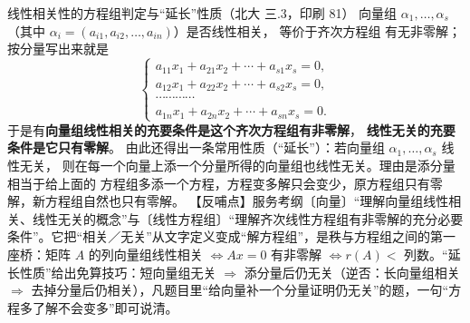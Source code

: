 
\begin{fdeep}{线性相关性的方程组判定与“延长”性质（北大 三.3，印刷 81）}
向量组 $\alpha_1,\dots,\alpha_s$（其中 $\alpha_i=(a_{i1},a_{i2},\dots,a_{in})$）是否线性相关，
等价于齐次方程组
有无非零解；按分量写出来就是
\[
\begin{cases}
a_{11}x_1+a_{21}x_2+\cdots+a_{s1}x_s=0,\\
a_{12}x_1+a_{22}x_2+\cdots+a_{s2}x_s=0,\\
\cdots\cdots\cdots\cdots\\
a_{1n}x_1+a_{2n}x_2+\cdots+a_{sn}x_s=0.
\end{cases}
\]
于是有\textbf{向量组线性相关的充要条件是这个齐次方程组有非零解}，
\textbf{线性无关的充要条件是它只有零解}。
由此还得出一条常用性质（“延长”）：若向量组 $\alpha_1,\dots,\alpha_s$ 线性无关，
则在每一个向量上添一个分量所得的向量组也线性无关。理由是添分量相当于给上面的
方程组多添一个方程，方程变多解只会变少，原方程组只有零解，新方程组自然也只有零解。
【反哺点】服务考纲〔向量〕“理解向量组线性相关、线性无关的概念”与〔线性方程组〕“理解齐次线性方程组有非零解的充分必要条件”。它把“相关／无关”从文字定义变成“解方程组”，是秩与方程组之间的第一座桥：矩阵 $A$ 的列向量组线性相关 $\iff Ax=0$ 有非零解 $\iff r(A)<$ 列数。“延长性质”给出免算技巧：短向量组无关 $\Rightarrow$ 添分量后仍无关（逆否：长向量组相关 $\Rightarrow$ 去掉分量后仍相关），凡题目里“给向量补一个分量证明仍无关”的题，一句“方程多了解不会变多”即可说清。
\end{fdeep}

